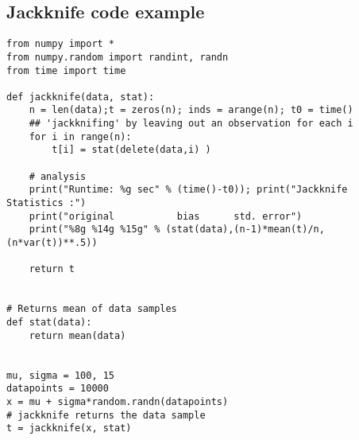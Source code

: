 \subsection*{Jackknife code example}






























\begin{verbatim}
from numpy import *
from numpy.random import randint, randn
from time import time

def jackknife(data, stat):
    n = len(data);t = zeros(n); inds = arange(n); t0 = time()
    ## 'jackknifing' by leaving out an observation for each i                                                                                                                      
    for i in range(n):
        t[i] = stat(delete(data,i) )

    # analysis                                                                                                                                                                     
    print("Runtime: %g sec" % (time()-t0)); print("Jackknife Statistics :")
    print("original           bias      std. error")
    print("%8g %14g %15g" % (stat(data),(n-1)*mean(t)/n, (n*var(t))**.5))

    return t


# Returns mean of data samples                                                                                                                                                     
def stat(data):
    return mean(data)


mu, sigma = 100, 15
datapoints = 10000
x = mu + sigma*random.randn(datapoints)
# jackknife returns the data sample                                                                                                                                                
t = jackknife(x, stat)


\end{verbatim}


